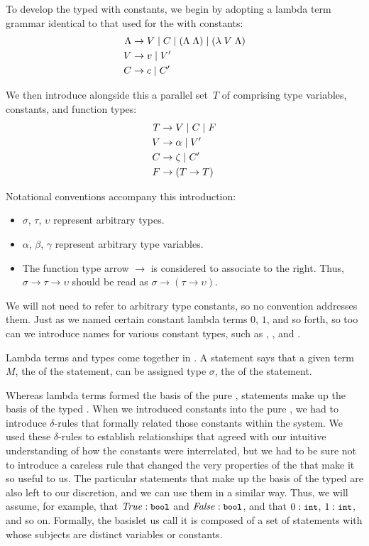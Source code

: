 To develop the typed \lambdacalc with constants, we begin by adopting a lambda term grammar identical to that used for the \lambdacalc with constants:
\begin{align*}
\Lambda &\produces V \alt C \alt (\Lambda\; \Lambda) \alt (\lambda\; V\; \Lambda)\\
V &\produces v \alt V\prime\\
C &\produces c \alt C\prime
\end{align*}

We then introduce alongside this a parallel set~$T$ of  comprising type variables, constants, and function types:
\begin{align*}
T &\produces V \alt C \alt F\\
V &\produces \alpha \alt V\prime\\
C &\produces \zeta \alt C\prime\\
F &\produces (T \to T)
\end{align*}

Notational conventions accompany this introduction:
\begin{itemize}
\item $\sigma$, $\tau$, $\upsilon$ represent arbitrary types.
\item $\alpha$, $\beta$, $\gamma$ represent arbitrary type variables.
\item The function type arrow $\to$ is considered to associate to the right. Thus, $\sigma \to \tau \to \upsilon$ should be read as $\sigma \to (\tau \to \upsilon)$.
\end{itemize}
We will not need to refer to arbitrary type constants, so no convention addresses them. Just as we named certain constant lambda terms $0$, $1$, and so forth, so too can we introduce names for various constant types, such as , , and .

Lambda terms and types come together in . A statement  says that a given term $M$, the  of the statement, can be assigned type $\sigma$, the  of the statement.

Whereas lambda terms formed the basis of the pure \lambdacalc{}, statements make up the basis of the typed \lambdacalc{}. When we introduced constants into the pure \lambdacalc{}, we had to introduce $\delta$-rules that formally related those constants within the system. We used these $\delta$-rules to establish relationships that agreed with our intuitive understanding of how the constants were interrelated, but we had to be sure not to introduce a careless rule that changed the very properties of the \lambdacalc that make it so useful to us. The particular statements that make up the basis of the typed \lambdacalc are also left to our discretion, and we can use them in a similar way. Thus, we will assume, for example, that  $\stmt[text]{\text{\const{True}}}{bool}$ and $\stmt[text]{\text{\const{False}}}{bool}$, and that $\stmt[text]{0}{int}$, $\stmt[text]{1}{int}$, and so on. Formally, the basis\empause let us call it \basis\empause is composed of a set of statements with whose subjects are distinct variables or constants.


